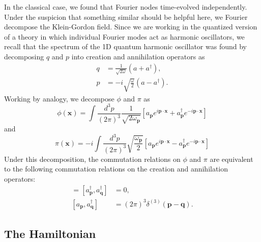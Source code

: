 \documentclass[12 pt]{article}
\newcommand{\B}[1]{\mathbf{#1}}
\numberwithin{equation}{section}
\begin{document}
In the classical case, we found that Fourier nodes time-evolved independently. Under the suspicion that something similar should be helpful here, we Fourier decompose the Klein-Gordon field. Since we are working in the quantized version of a theory in which individual Fourier modes act as harmonic oscillators, we recall that the spectrum of the 1D quantum harmonic oscillator was found by decomposing $q$ and $p$ into creation and annihilation operators as \begin{align*}
q & = \frac{1}{\sqrt{2 \omega}}(a + a^\dagger), \\
p & = -i \sqrt{\frac{\omega}{2}} (a - a^\dagger).
\end{align*}
Working by analogy, we decompose $\phi$ and $\pi$ as \begin{equation}
\phi(\B{x}) = \int \frac{d^3 p}{(2 \pi)^3} \frac{1}{\sqrt{2 \omega_\B{p}}} \left[ a_{\B{p}} e^{i \B{p} \cdot \B{x}} + a^\dagger_{\B{p}} e^{- i \B{p} \cdot \B{x}} \right]
\end{equation}
and
\begin{equation}
\pi(\B{x}) = -i \int \frac{d^3 p}{(2 \pi)^3} \sqrt{\frac{\omega_\B{p}}{2}} \left[ a_{\B{p}} e^{i \B{p} \cdot \B{x}} - a^\dagger_{\B{p}} e^{- i \B{p} \cdot \B{x}} \right]
\end{equation}
Under this decomposition, the commutation relations on $\phi$ and $\pi$ are equivalent to the following commutation relations on the creation and annihilation operators: \begin{align*}
[a_{\B{p}}, a_{\B{q}}] = [a^\dagger_{\B{p}}, a^\dagger_{\B{q}}] & = 0, \\
[a_{\B{p}}, a^\dagger_{\B{q}}] & = (2 \pi)^3 \delta^{(3)}(\B{p} - \B{q}).
\end{align*}

\subsection{The Hamiltonian}
\end{document}
